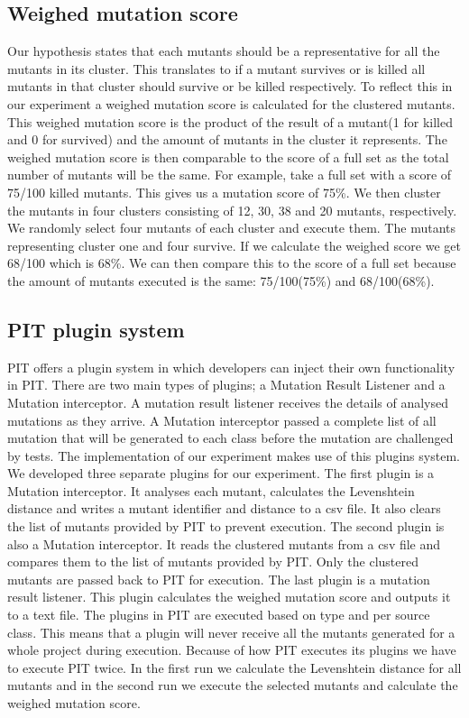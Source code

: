 \documentclass[../main]{subfiles}
\begin{document}
\subsection{Weighed mutation score}
Our hypothesis states that each mutants should be a representative for all the mutants in its cluster. 
This translates to if a mutant survives or is killed all mutants in that cluster should survive or be killed respectively.
To reflect this in our experiment a weighed mutation score is calculated for the clustered mutants.
This weighed mutation score is the product of the result of a mutant(1 for killed and 0 for survived) and the amount of mutants in the cluster it represents.
The weighed mutation score is then comparable to the score of a full set as the total number of mutants will be the same.
\newline
For example, take a full set with a score of 75/100 killed mutants. 
This gives us a mutation score of 75\%. 
We then cluster the mutants in four clusters consisting of 12, 30, 38 and 20 mutants, respectively.
We randomly select four mutants of each cluster and execute them.
The mutants representing cluster one and four survive.
If we calculate the weighed score we get 68/100 which is 68\%.
We can then compare this to the score of a full set because the amount of mutants executed is the same: 75/100(75\%) and 68/100(68\%).


\subsection{PIT plugin system}
PIT offers a plugin system in which developers can inject their own functionality in PIT\cite{pitestPlugin}. 
There are two main types of plugins; a Mutation Result Listener and a Mutation interceptor\cite{pitestPlugin}.
A mutation result listener  receives the details of analysed mutations as they arrive\cite{pitestPlugin}.
A Mutation interceptor passed a complete list of all mutation that will be generated to each class before the mutation are challenged by tests\cite{pitestPlugin}.
The implementation of our experiment makes use of this plugins system.
\newline
We developed three separate plugins for our experiment.
The first plugin is a Mutation interceptor.
It analyses each mutant, calculates the Levenshtein distance and writes a mutant identifier and distance to a \acrshort{csv} file. 
It also clears the list of mutants provided by PIT to prevent execution. 
The second plugin is also a Mutation interceptor.
It reads the clustered mutants from a \acrshort{csv} file and compares them to the list of mutants provided by PIT.
Only the clustered mutants are passed back to PIT for execution.
The last plugin is a mutation result listener. 
This plugin calculates the weighed mutation score and outputs it to a text file.
\newline
The plugins in PIT are executed based on type and per source class.
This means that a plugin will never receive all the mutants generated for a whole project during execution.
Because of how PIT executes its plugins we have to execute PIT twice.
In the first run we calculate the Levenshtein distance for all mutants and in the second run we execute the selected mutants and calculate the weighed mutation score.
\end{document}
